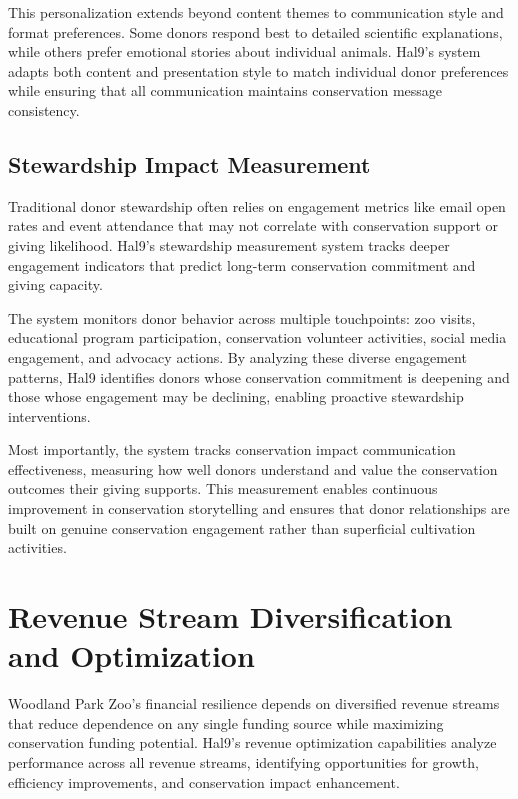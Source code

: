 \documentclass[
  Letterpaper,
]{scrbook}
\begin{document}
This personalization extends beyond content themes to communication
style and format preferences. Some donors respond best to detailed
scientific explanations, while others prefer emotional stories about
individual animals. Hal9's system adapts both content and presentation
style to match individual donor preferences while ensuring that all
communication maintains conservation message consistency.

\subsection{Stewardship Impact
Measurement}\label{stewardship-impact-measurement}

Traditional donor stewardship often relies on engagement metrics like
email open rates and event attendance that may not correlate with
conservation support or giving likelihood. Hal9's stewardship
measurement system tracks deeper engagement indicators that predict
long-term conservation commitment and giving capacity.

The system monitors donor behavior across multiple touchpoints: zoo
visits, educational program participation, conservation volunteer
activities, social media engagement, and advocacy actions. By analyzing
these diverse engagement patterns, Hal9 identifies donors whose
conservation commitment is deepening and those whose engagement may be
declining, enabling proactive stewardship interventions.

Most importantly, the system tracks conservation impact communication
effectiveness, measuring how well donors understand and value the
conservation outcomes their giving supports. This measurement enables
continuous improvement in conservation storytelling and ensures that
donor relationships are built on genuine conservation engagement rather
than superficial cultivation activities.

\section{Revenue Stream Diversification and
Optimization}\label{revenue-stream-diversification-and-optimization}

Woodland Park Zoo's financial resilience depends on diversified revenue
streams that reduce dependence on any single funding source while
maximizing conservation funding potential. Hal9's revenue optimization
capabilities analyze performance across all revenue streams, identifying
opportunities for growth, efficiency improvements, and conservation
impact enhancement.
\end{document}

